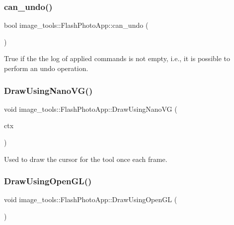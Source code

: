\subsubsection{\texorpdfstring{can\+\_\+undo()}{can\_undo()}}
{\footnotesize\ttfamily bool image\+\_\+tools\+::\+Flash\+Photo\+App\+::can\+\_\+undo (\begin{DoxyParamCaption}{ }\end{DoxyParamCaption})}

True if the the log of applied commands is not empty, i.\+e., it is possible to perform an undo operation. \mbox{\label{classimage__tools_1_1FlashPhotoApp_abda3c07c67a29eba47e341bdf0223e7a}} 
\subsubsection{\texorpdfstring{Draw\+Using\+Nano\+V\+G()}{DrawUsingNanoVG()}}
{\footnotesize\ttfamily void image\+\_\+tools\+::\+Flash\+Photo\+App\+::\+Draw\+Using\+Nano\+VG (\begin{DoxyParamCaption}\item[{N\+V\+Gcontext $\ast$}]{ctx }\end{DoxyParamCaption})\hspace{0.3cm}{\ttfamily [override]}}

Used to draw the cursor for the tool once each frame. \mbox{\label{classimage__tools_1_1FlashPhotoApp_a58e520556daa81224cb0a76a3fca9b78}} 
\subsubsection{\texorpdfstring{Draw\+Using\+Open\+G\+L()}{DrawUsingOpenGL()}}
{\footnotesize\ttfamily void image\+\_\+tools\+::\+Flash\+Photo\+App\+::\+Draw\+Using\+Open\+GL (\begin{DoxyParamCaption}{ }\end{DoxyParamCaption})\hspace{0.3cm}{\ttfamily [override]}}

